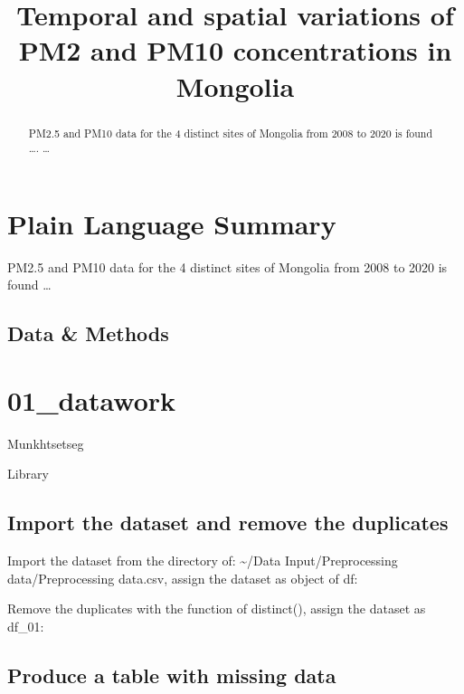 \documentclass[
]{agujournal2019}
\begin{document}
\title{Temporal and spatial variations of PM2 and PM10 concentrations in
Mongolia}



\begin{abstract}
PM2.5 and PM10 data for the 4 distinct sites of Mongolia from 2008 to
2020 is found \ldots. \ldots{}
\end{abstract}

\section*{Plain Language Summary}
PM2.5 and PM10 data for the 4 distinct sites of Mongolia from 2008 to
2020 is found \ldots{}



\subsection{Data \& Methods}\label{sec-data-methods}

\section{01\_datawork}\label{datawork}

Munkhtsetseg

Library

\subsection{Import the dataset and remove the
duplicates}\label{import-the-dataset-and-remove-the-duplicates}

Import the dataset from the directory of: \textasciitilde/Data
Input/Preprocessing data/Preprocessing data.csv, assign the dataset as
object of df:

Remove the duplicates with the function of distinct(), assign the
dataset as df\_01:

\subsection{Produce a table with missing
data}\label{produce-a-table-with-missing-data}
\end{document}
